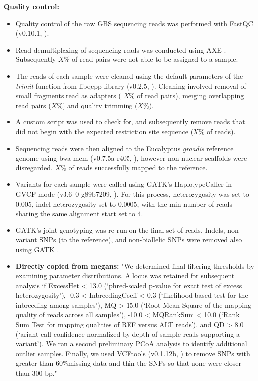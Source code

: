 \textbf{Quality control:}
\begin{itemize}
\item Quality control of the raw GBS sequencing reads was performed with FastQC (v0.10.1, \cite{SAndrews}).
\item Read demultiplexing of sequencing reads was conducted using AXE \cite{Murray2018}. Subsequently $X \%$ of read pairs were not able to be assigned to a sample.
\item The reads of each sample were cleaned using the default parameters of the \textit{trimit} function from libqcpp library  (v0.2.5, \cite{Murray2017}). Cleaning involved removal of small fragments read as adapters ( $X\%$ of read pairs), merging overlapping read pairs ($X\%$) and quality trimming ($X\%$).
\item A custom script was used to check for, and subsequently remove reads that did not begin with the expected restriction site sequence ($X\%$ of reads).
\item Sequencing reads were then aligned to the Eucalyptus \textit{grandis} reference genome \cite{JGI2015,Bartholome2015,Myburg2014} using bwa-mem (v0.7.5a-r405, \cite{Li2013}), however non-nuclear scaffolds were disregarded. $X\%$ of reads successfully mapped to the reference.
\item Variants for each sample were called using GATK's HaplotypeCaller in GVCF mode (v3.6–0-g89b7209, \cite{McKenna2010}). For this process, heterozygosity was set to 0.005, indel heterozygosity set to 0.0005, with the min number of reads sharing the same alignment start set to 4.
\end{itemize}

\begin{itemize}
\item GATK's joint genotyping was re-run on the final set of reads. Indels, non-variant SNPs (to the reference), and non-biallelic SNPs were removed also using GATK \cite{McKenna2010}.
\item \textbf{Directly copied from megans: }"We determined final filtering thresholds by examining parameter distributions. A locus was retained for subsequent analysis if ExcessHet < 13.0 (‘phred-scaled p-value for exact test of excess heterozygosity’), -0.3 < InbreedingCoeff < 0.3 (‘likelihood-based test for the inbreeding among samples’), MQ > 15.0 (‘Root Mean Square of the mapping quality of reads across all samples’), -10.0 < MQRankSum < 10.0 (‘Rank Sum Test for mapping qualities of REF versus ALT reads’), and QD > 8.0 (‘ariant call confidence normalized by depth of sample reads supporting a variant’). We ran a second preliminary PCoA analysis to identify additional outlier samples. Finally, we used VCFtools (v0.1.12b, \cite{Danecek2011}) to remove SNPs with greater than 60$\% $missing data and thin the SNPs so that none were closer than 300 bp."
\end{itemize}

